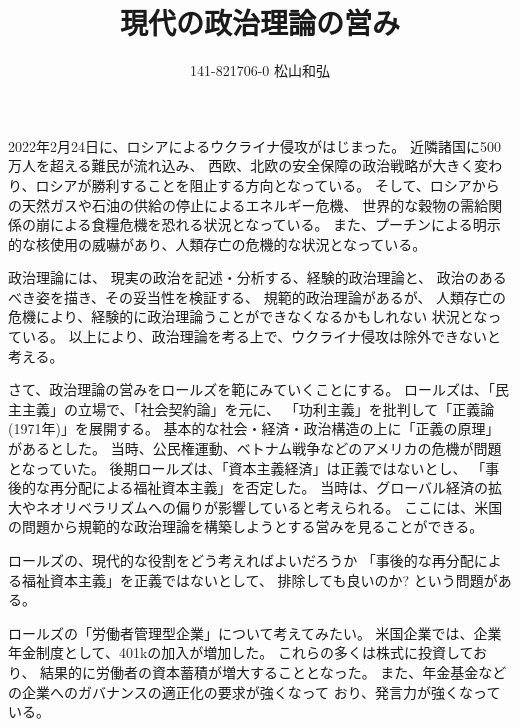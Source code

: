 \documentclass{jsarticle}
\begin{document}
\title{現代の政治理論の営み}
\author{141-821706-0 松山和弘}
\maketitle

2022年2月24日に、ロシアによるウクライナ侵攻がはじまった。
近隣諸国に500万人を超える難民が流れ込み、
西欧、北欧の安全保障の政治戦略が大きく変わり、ロシアが勝利することを阻止する方向となっている。
そして、ロシアからの天然ガスや石油の供給の停止によるエネルギー危機、
世界的な穀物の需給関係の崩による食糧危機を恐れる状況となっている。
また、プーチンによる明示的な核使用の威嚇があり、人類存亡の危機的な状況となっている。

政治理論には、
現実の政治を記述・分析する、経験的政治理論と、
政治のあるべき姿を描き、その妥当性を検証する、
規範的政治理論があるが、
人類存亡の危機により、経験的に政治理論うことができなくなるかもしれない
状況となっている。
以上により、政治理論を考る上で、ウクライナ侵攻は除外できないと考える。

さて、政治理論の営みをロールズを範にみていくことにする。
ロールズは、「民主主義」の立場で、「社会契約論」を元に、
「功利主義」を批判して「正義論(1971年)」を展開する。
基本的な社会・経済・政治構造の上に「正義の原理」があるとした。
当時、公民権運動、ベトナム戦争などのアメリカの危機が問題となっていた。
後期ロールズは、「資本主義経済」は正義ではないとし、
「事後的な再分配による福祉資本主義」を否定した。
当時は、グローバル経済の拡大やネオリベラリズムへの偏りが影響していると考えられる。
ここには、米国の問題から規範的な政治理論を構築しようとする営みを見ることができる。

ロールズの、現代的な役割をどう考えればよいだろうか
「事後的な再分配による福祉資本主義」を正義ではないとして、
排除しても良いのか?
という問題がある。

ロールズの「労働者管理型企業」について考えてみたい。
米国企業では、企業年金制度として、401kの加入が増加した。
これらの多くは株式に投資しており、
結果的に労働者の資本蓄積が増大することとなった。
また、年金基金などの企業へのガバナンスの適正化の要求が強くなって
おり、発言力が強くなっている。
\end{document}
